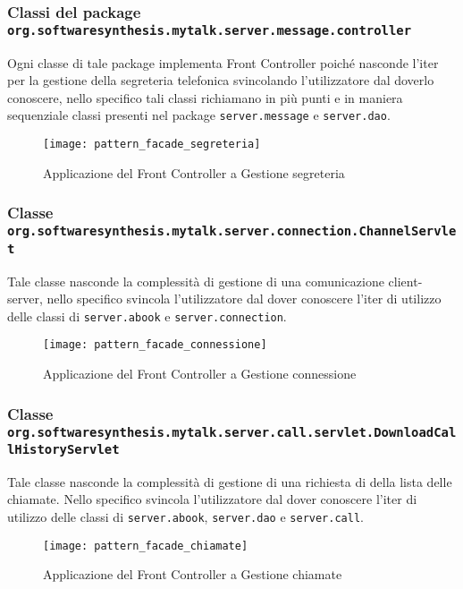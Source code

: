 \subsubsection*{Classi del package \texttt{org.softwaresynthesis.mytalk.server.message.controller}}

Ogni classe di tale package implementa Front Controller poiché nasconde l'iter per la gestione della segreteria telefonica svincolando l'utilizzatore dal doverlo conoscere, nello specifico tali classi richiamano in più punti e in maniera sequenziale classi presenti nel package \texttt{server.message} e \texttt{server.dao}.

\begin{figure}[H]
  \centering
  \texttt{[image: pattern\_facade\_segreteria]}
  \caption{Applicazione del  Front Controller a \textsf{Gestione segreteria}}\label{fig:facadeaddressbook2}
\end{figure}

\subsubsection*{Classe \texttt{org.softwaresynthesis.mytalk.server.connection.ChannelServlet}}

Tale classe nasconde la complessità di gestione di una comunicazione client-server, nello specifico svincola l'utilizzatore dal dover conoscere l'iter di utilizzo delle classi di \texttt{server.abook} e \texttt{server.connection}.

\begin{figure}[H]
  \centering
     \texttt{[image: pattern\_facade\_connessione]}
  \caption{Applicazione del  Front Controller a \textsf{Gestione connessione}}\label{fig:facadeconnection}
\end{figure}

\subsubsection*{Classe \texttt{org.softwaresynthesis.mytalk.server.call.servlet.DownloadCallHistoryServlet}}

Tale classe nasconde la complessità di gestione di una richiesta di  della lista delle chiamate. Nello specifico svincola l'utilizzatore dal dover conoscere l'iter di utilizzo delle classi di \texttt{server.abook}, \texttt{server.dao} e \texttt{server.call}.

\begin{figure}[H]
  \centering
   \texttt{[image: pattern\_facade\_chiamate]}
  \caption{Applicazione del  Front Controller a \textsf{Gestione chiamate}}\label{fig:facadestate}
\end{figure}

